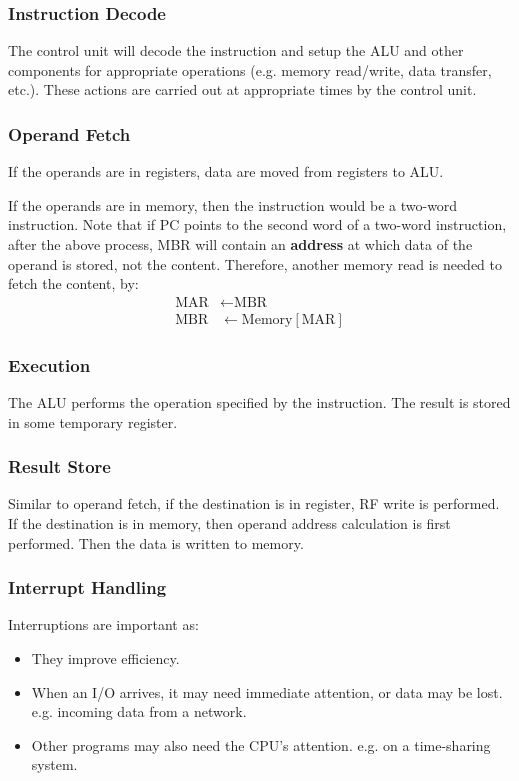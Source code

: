 \subsubsection{Instruction Decode}

The control unit will decode the instruction and setup the ALU and other components
for appropriate operations (e.g. memory read/write, data transfer, etc.). These actions
are carried out at appropriate times by the control unit.

\subsubsection{Operand Fetch}

If the operands are in registers, data are moved from registers to ALU.

If the operands are in memory, then the instruction would be a two-word instruction.
Note that if PC points to the second word of a two-word instruction, after the above process,
MBR will contain an \textbf{address} at which data of the operand is stored,
not the content. Therefore, another
memory read is needed to fetch the content, by:
\begin{align*}
    \text{MAR} &\leftarrow \text{MBR} \\
    \text{MBR} &\leftarrow \text{Memory}[\text{MAR}]
\end{align*}

\subsubsection{Execution}

The ALU performs the operation specified by the instruction. The result is stored in
some temporary register.

\subsubsection{Result Store}

Similar to operand fetch, if the destination is in register, RF write is performed.
If the destination is in memory, then operand address calculation is first performed.
Then the data is written to memory.

\subsubsection{Interrupt Handling} \label{subsubsec:interrupts}

Interruptions are important as:
\begin{itemize}
    \item They improve efficiency.
    \item When an I/O arrives, it may need immediate attention, or data may be lost.
        e.g. incoming data from a network.
    \item Other programs may also need the CPU's attention. e.g. on a time-sharing system.
\end{itemize}


